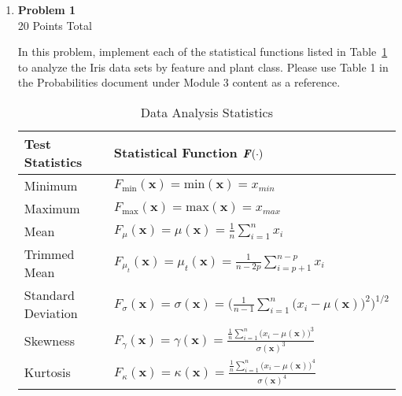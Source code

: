 \documentclass{article}
\begin{document}
\begin{enumerate}

    \item \textbf{Problem 1}  \\
    20 Points Total 

    In this problem, implement each of the statistical functions listed in Table~\ref{tab:data_moments} to analyze the Iris data sets by feature and plant class. Please use Table 1 in the Probabilities document under Module 3 content as a reference.

    
    	\begin{table}[ht]
		\centering
		\caption{Data Analysis Statistics}
			\begin{tabular}{|l|l|} 
			\hline
			\bigstrut
        			\textbf{Test Statistics}    & \textbf{Statistical Function} $\textbf{\textit{F}}(\cdot)$  \\ 
			\hline \hline
			\bigstrut
			Minimum             & $F_{\text{min}}(\textbf{x}) = \text{min}(\textbf{x}) = x_{min}$ \\ 
			\hline
			\bigstrut
			Maximum             & $F_{\text{max}}(\textbf{x}) = \text{max}(\textbf{x}) = x_{max}$ \\ 
			\hline
			\bigstrut
			Mean               		     & $F_{\mu}(\textbf{x}) = \mu(\textbf{x}) = \frac{1}{n} \sum\limits^n_{i=1} x_i$ \\ 
			\hline
			\bigstrut
			Trimmed Mean              & $F_{\mu_t}(\textbf{x}) =  \mu_t(\textbf{x}) = \frac{1}{n - 2p} \sum\limits^{n-p}_{i=p+1} x_i $ \\  
			\hline
			\bigstrut
			Standard Deviation        & $F_{\sigma}(\textbf{x}) =  \sigma(\textbf{x}) = \Big(\frac{1}{n-1} \sum\limits^n_{i=1} \big(x_i - \mu(\textbf{x})\big)^2  \Big)^{1/2}$\\ 
			\hline
			\bigstrut
			Skewness                      & $F_{\gamma}(\textbf{x}) = \gamma (\textbf{x}) = \displaystyle\frac{ \frac{1}{n} \sum\limits^n_{i=1} \big(x_i - \mu(\textbf{x})\big)^3}{\sigma(\textbf{x})^3}$ \\ 
			\hline
			\bigstrut
			Kurtosis                        &  $F_{\kappa}(\textbf{x}) = \kappa (\textbf{x}) = \displaystyle\frac{ \frac{1}{n}  \sum\limits^n_{i=1} \big(x_i - \mu(\textbf{x})\big)^4}{\sigma(\textbf{x})^4}$\\ 
			\hline
			\end{tabular}
			\label{tab:data_moments}
		\end{table} 
		

\end{enumerate}
\end{document}
